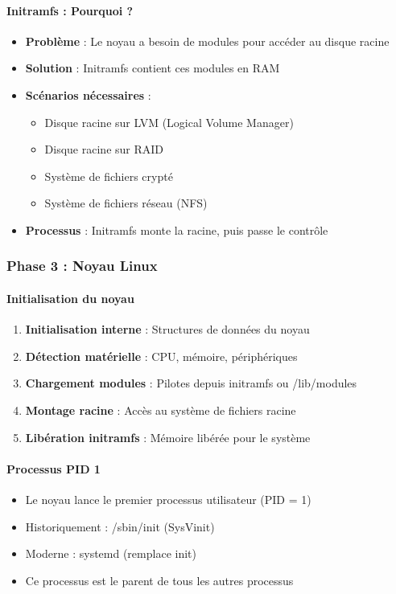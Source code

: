 \documentclass[12pt,a4paper]{article}
\begin{document}
\paragraph{Initramfs : Pourquoi ?}
\begin{itemize}
    \item \textbf{Problème} : Le noyau a besoin de modules pour accéder au disque racine
    \item \textbf{Solution} : Initramfs contient ces modules en RAM
    \item \textbf{Scénarios nécessaires} :
    \begin{itemize}
        \item Disque racine sur LVM (Logical Volume Manager)
        \item Disque racine sur RAID
        \item Système de fichiers crypté
        \item Système de fichiers réseau (NFS)
    \end{itemize}
    \item \textbf{Processus} : Initramfs monte la racine, puis passe le contrôle
\end{itemize}

\subsubsection{Phase 3 : Noyau Linux}

\paragraph{Initialisation du noyau}
\begin{enumerate}
    \item \textbf{Initialisation interne} : Structures de données du noyau
    \item \textbf{Détection matérielle} : CPU, mémoire, périphériques
    \item \textbf{Chargement modules} : Pilotes depuis initramfs ou /lib/modules
    \item \textbf{Montage racine} : Accès au système de fichiers racine
    \item \textbf{Libération initramfs} : Mémoire libérée pour le système
\end{enumerate}

\paragraph{Processus PID 1}
\begin{itemize}
    \item Le noyau lance le premier processus utilisateur (PID = 1)
    \item Historiquement : /sbin/init (SysVinit)
    \item Moderne : systemd (remplace init)
    \item Ce processus est le parent de tous les autres processus
\end{itemize}
\end{document}
